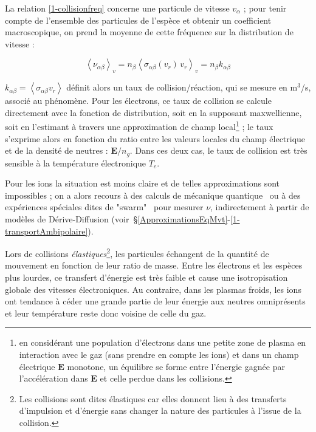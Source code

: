 \begin{refsection}
La relation \eqref{1-collisionfreq}
concerne une particule de vitesse $v_\alpha$ ; pour tenir compte de l'ensemble des particules
de l'espèce et obtenir un coefficient macroscopique, on prend la moyenne de
cette fréquence sur la distribution de vitesse :

\begin{equation}
\label{1-collisionfreqMacro}
	\left<\nu_{\alpha
	\beta}\right>_v=n_\beta\left<\sigma_{\alpha
	\beta}(v_r)\,v_r\right>_v=n_\beta k_{\alpha
	\beta}
\end{equation}

$k_{\alpha\beta}=\left<\sigma_{\alpha\beta}
v_r\right>$ définit alors un taux de collision/réaction, qui se mesure en
m$^{3}$/s, associé au phénomène. Pour les électrons, ce taux de collision se
calcule directement avec la fonction de distribution, soit en la supposant 
maxwellienne, soit en l'estimant à travers une approximation de
champ local\footnote{en considérant une population d'électrons dans une
petite zone de plasma en interaction avec le gaz (sans prendre en compte les ions) et
dans un champ électrique $\mathbf E$ monotone, un équilibre se forme entre
l'énergie gagnée par l'accélération dans $\mathbf E$ et celle perdue dans les
collisions.} ; le taux s'exprime alors en fonction du ratio entre les
valeurs locales du champ électrique et de la densité de neutres : $\mathbf E/n_g$.
Dans ces deux cas, le taux de collision est très sensible à la température
électronique $T_e$. 

Pour les ions la situation est moins claire et
de telles approximations sont impossibles ; on a alors recours à des calculs de
mécanique quantique~\parencite{raju} ou à des expériences spéciales dites de
"swarm"~\parencite{Phelps} pour mesurer $\nu$, indirectement à partir de
modèles de Dérive-Diffusion (voir~\S\ref{ApproximationsEqMvt}-\ref{1-transportAmbipolaire}).

Lors de collisions
\emph{élastiques}\footnote{Les collisions sont dites élastiques car elles
donnent lieu à des transferts d'impulsion et d'énergie sans changer la nature
des particules à l'issue de la collision.}, les particules échangent de la
quantité de mouvement en fonction de leur ratio de masse. Entre les électrons
et les espèces plus lourdes, ce transfert d'énergie est très faible et cause
une isotropisation globale des vitesses électroniques. Au contraire, dans les
plasmas froids, les ions ont
tendance à céder une grande partie de leur énergie aux
neutres omniprésents et leur température reste donc voisine de celle du gaz. 


\end{refsection}
